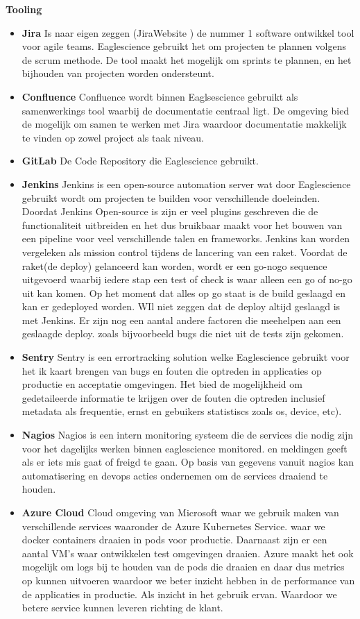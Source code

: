 \textbf{Tooling}
\begin{itemize}
\item \textbf{Jira} Is naar eigen zeggen (JiraWebsite ) de nummer 1 software ontwikkel tool voor agile teams. Eaglescience gebruikt het om projecten te plannen volgens de scrum methode. De tool maakt het mogelijk om sprints te plannen, en het bijhouden van projecten worden ondersteunt.
\item \textbf{Confluence}
Confluence wordt binnen Eaglsescience gebruikt als samenwerkings tool waarbij de documentatie centraal ligt. De omgeving bied de mogelijk om samen te werken met Jira waardoor documentatie makkelijk te vinden op zowel project als taak niveau.
\item \textbf{GitLab}
De Code Repository die Eaglescience gebruikt.
\item \textbf{Jenkins}
Jenkins is een open-source automation server wat door Eaglescience gebruikt wordt om projecten te builden voor verschillende doeleinden. Doordat Jenkins Open-source is zijn er veel plugins geschreven die de functionaliteit uitbreiden en het dus bruikbaar maakt voor het bouwen van een pipeline voor veel verschillende talen en frameworks.
Jenkins kan worden vergeleken als mission control tijdens de lancering van een raket. Voordat de raket(de deploy) gelanceerd kan worden, wordt er een go-nogo sequence uitgevoerd waarbij iedere stap een test of check is waar alleen een go of no-go uit kan komen. Op het moment dat alles op go staat is de build geslaagd en kan er gedeployed worden. WIl niet zeggen dat de deploy altijd geslaagd is met Jenkins. Er zijn nog een aantal andere factoren die meehelpen aan een geslaagde deploy. zoals bijvoorbeeld bugs die niet uit de tests zijn gekomen.
\item \textbf{Sentry}
Sentry is een errortracking solution welke Eaglescience gebruikt voor het ik kaart brengen van bugs en fouten die optreden in applicaties op productie en acceptatie omgevingen. Het bied de mogelijkheid om gedetaileerde informatie te krijgen over de fouten die optreden inclusief metadata als frequentie, ernst en gebuikers statistiscs zoals os, device, etc).
\item \textbf{Nagios}
Nagios is een intern monitoring systeem die de services die nodig zijn voor het dagelijks werken binnen eaglescience monitored. en meldingen geeft als er iets mis gaat of freigd te gaan. Op basis van gegevens vanuit nagios kan automatisering en devops acties ondernemen om de services draaiend te houden.
\item \textbf{Azure Cloud}
Cloud omgeving van Microsoft waar we gebruik maken van verschillende services waaronder de Azure Kubernetes Service. waar we docker containers draaien in pods voor productie. Daarnaast zijn er een aantal VM's waar ontwikkelen test omgevingen draaien. Azure maakt het ook mogelijk om logs bij te houden van de pods die draaien en daar dus metrics op kunnen uitvoeren waardoor we beter inzicht hebben in de performance van de applicaties in productie. Als inzicht in het gebruik ervan. Waardoor we betere service kunnen leveren richting de klant.
\end{itemize}

